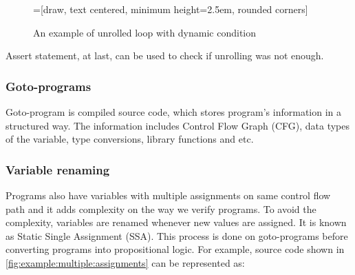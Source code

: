 \begin{figure}[htbp]
    \centering
    =[draw, text centered, minimum height=2.5em, rounded corners]

   \caption{An example of unrolled loop with dynamic condition}
   \label{fig:example:unrolled:loop:with:dynamic:condition}
\end{figure}

Assert statement, at last, can be used to check if unrolling was not enough.


\subsubsection{Goto-programs}
Goto-program is compiled source code, which stores program's information in a structured way. The information includes Control Flow Graph (CFG), data types of the variable, type conversions, library functions and etc.


\subsubsection{Variable renaming}
Programs also have variables with multiple assignments on same control flow path and it adds complexity on the way we verify programs. To avoid the complexity, variables are renamed whenever new values are assigned. It is known as Static Single Assignment (SSA). This process is done on goto-programs before converting programs into propositional logic. For example, source code shown in \autoref{fig:example:multiple:assignments} can be represented as: 

